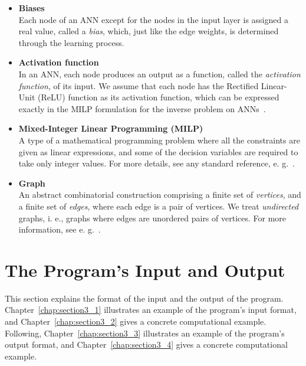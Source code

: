 \documentclass[11pt,titlepage,dvipdfmx,twoside]{book}
\begin{document}
\begin{itemize}
\item {\bf Biases}\\
Each node of an ANN except for the nodes in the input layer
is assigned a real value, called a {\em bias},
which, just like the edge weights, is determined through the learning process.


\item {\bf Activation function}\\
%
In an ANN, each node produces an output as a function, called the \emph{activation function}, 
of its input.
We assume that each node has the Rectified Linear-Unit (ReLU) function 
as its activation function,
which can be expressed exactly in the MILP formulation
for the inverse problem on ANNs~\cite{AN19}.

\item {\bf Mixed-Integer Linear Programming (MILP)}\\
%
A type of a mathematical programming problem
where all the constraints are given as linear expressions, and
some of the decision variables are required to take
only integer values.
For more details, see any standard reference, e. g.~\cite{LP}.


\item {\bf Graph} \\
An abstract combinatorial construction comprising
a finite set of {\em vertices}, and a finite set of {\em edges},
where each edge is a pair of vertices.
We treat {\em undirected} graphs,
i. e., graphs where edges are unordered pairs of vertices.
For more information, see e. g.~\cite{graph}.

\end{itemize}


\section{The Program's Input and Output}
\label{chap:InOut}

This section explains the format of the input and the output of the program.
Chapter~\ref{chap:section3_1} illustrates an example of the program's input format,
and Chapter~\ref{chap:section3_2} gives a concrete computational example.
Following, Chapter~\ref{chap:section3_3} illustrates an example of the program's output format,
and Chapter~\ref{chap:section3_4} gives a concrete computational example.
\end{document}
